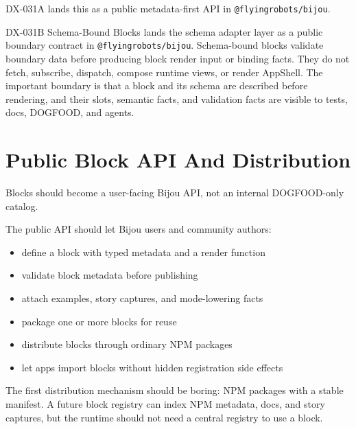 DX-031A lands this as a public metadata-first API in \texttt{@\allowbreak{}f\allowbreak{}l\allowbreak{}y\allowbreak{}i\allowbreak{}n\allowbreak{}g\allowbreak{}r\allowbreak{}o\allowbreak{}b\allowbreak{}o\allowbreak{}t\allowbreak{}s\allowbreak{}/\allowbreak{}b\allowbreak{}i\allowbreak{}j\allowbreak{}o\allowbreak{}u}.

DX-031B Schema-Bound Blocks lands the schema adapter layer as a public boundary contract in \texttt{@\allowbreak{}f\allowbreak{}l\allowbreak{}y\allowbreak{}i\allowbreak{}n\allowbreak{}g\allowbreak{}r\allowbreak{}o\allowbreak{}b\allowbreak{}o\allowbreak{}t\allowbreak{}s\allowbreak{}/\allowbreak{}b\allowbreak{}i\allowbreak{}j\allowbreak{}o\allowbreak{}u}. Schema-bound blocks validate boundary data before producing block render input or binding facts. They do not fetch, subscribe, dispatch, compose runtime views, or render AppShell. The important boundary is that a block and its schema are described before rendering, and their slots, semantic facts, and validation facts are visible to tests, docs, DOGFOOD, and agents.

\section{Public Block API And Distribution}\label{record-128-public-block-api-and-distribution}

Blocks should become a user-facing Bijou API, not an internal DOGFOOD-only catalog.

The public API should let Bijou users and community authors:

\begin{itemize}
\tightlist
\item
  define a block with typed metadata and a render function
\item
  validate block metadata before publishing
\item
  attach examples, story captures, and mode-lowering facts
\item
  package one or more blocks for reuse
\item
  distribute blocks through ordinary NPM packages
\item
  let apps import blocks without hidden registration side effects
\end{itemize}

The first distribution mechanism should be boring: NPM packages with a stable manifest. A future block registry can index NPM metadata, docs, and story captures, but the runtime should not need a central registry to use a block.

